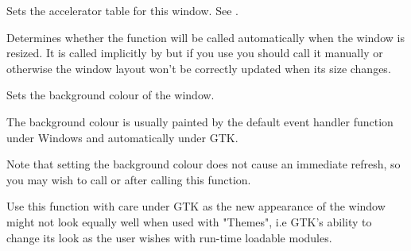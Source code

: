 
Sets the accelerator table for this window. See .

\label{wxwindowsetautolayout}


Determines whether the  function will
be called automatically when the window is resized. It is called implicitly by 
 but if you use 
 you should call it
manually or otherwise the window layout won't be correctly updated when its
size changes.





\label{wxwindowsetbackgroundcolour}


Sets the background colour of the window.




The background colour is usually painted by the default\rtfsp
{} event handler function
under Windows and automatically under GTK.

Note that setting the background colour does not cause an immediate refresh, so you
may wish to call  or  after
calling this function.

Use this function with care under GTK as the new appearance of the window might
not look equally well when used with "Themes", i.e GTK's ability to change its
look as the user wishes with run-time loadable modules.


